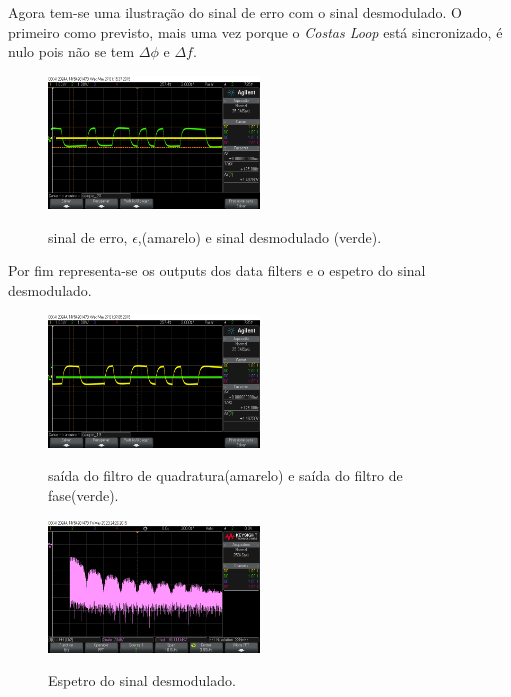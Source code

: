 \documentclass[11pt]{article}
\numberwithin{equation}{section}
\begin{document}
Agora tem-se uma ilustração do sinal de erro com o sinal desmodulado. O primeiro como previsto, mais uma vez porque o \textit{Costas Loop} está sincronizado, é nulo pois não se tem $\Delta\phi$ e $\Delta f$.

\begin{figure}[H]
	\centering
	\includegraphics[width=0.5\textwidth]{./erro_y1n}~\\
	\caption{sinal de erro, $\epsilon$,(amarelo) e sinal desmodulado (verde).}
	\label{erro_y1n}
\end{figure}

Por fim representa-se os outputs dos data filters e o espetro do sinal desmodulado.

\begin{figure}[H]
	\centering
	\includegraphics[width=0.5\textwidth]{./y1_y2n}~\\
	\caption{saída do filtro de quadratura(amarelo) e saída do filtro de fase(verde).}
	\label{y1_y2n}
\end{figure}

\begin{figure}[H]
	\centering
	\includegraphics[width=0.5\textwidth]{./espetro}~\\
	\caption{Espetro do sinal desmodulado.}
	\label{espetro}
\end{figure}
\end{document}
